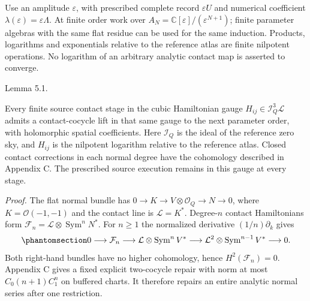 \documentclass[
  english,
  11pt,
  reqno]{amsart}
\makeatletter
\newcommand{\pandocstatementheading}[1]{%
  \par\addpenalty{\@beginparpenalty}%
  \addvspace{.5\baselineskip plus .2\baselineskip minus .2\baselineskip}%
  {\normalfont\bfseries #1\par}%
  \nobreak\@afterindenttrue\@afterheading
}
\makeatother
\begin{document}
Use an amplitude \(\varepsilon\), with prescribed complete record
\(\varepsilon U\) and numerical coefficient
\(\lambda(\varepsilon)=\varepsilon\Lambda\). At finite order work over
\(A_N=\mathbb C[\varepsilon]/(\varepsilon^{N+1})\); finite parameter
algebras with the same flat residue can be used for the same induction.
Products, logarithms and exponentials relative to the reference atlas
are finite nilpotent operations. No logarithm of an arbitrary analytic
contact map is asserted to converge.

\pandocstatementheading{\protect{}\label{lem:gg-contact-extension}

\protect\phantomsection\label{lem:gg-contact-extension-cubic}Lemma 5.1.}

Every finite source contact stage in the cubic Hamiltonian gauge
\(H_{ij}\in\mathcal I_Q^3\mathcal L\) admits a contact-cocycle lift in
that same gauge to the next parameter order, with holomorphic spatial
coefficients. Here \(\mathcal I_Q\) is the ideal of the reference zero
sky, and \(H_{ij}\) is the nilpotent logarithm relative to the reference
atlas. Closed contact corrections in each normal degree have the
cohomology described in Appendix C. The prescribed source execution
remains in this gauge at every stage.

\emph{Proof.} The flat normal bundle has
\(0\to K\to V\otimes\mathcal O_Q\to N\to0\), where
\(K=\mathcal O(-1,-1)\) and the contact line is \(\mathcal L=K^*\).
Degree-\(n\) contact Hamiltonians form
\(\mathcal F_n=\mathcal L\otimes\operatorname{Sym}^nN^*\). For \(n\ge1\)
the normalized derivative \((1/n)\partial_k\) gives
\begin{equation}\protect\phantomsection\label{eq:gg-contact-normal-sequence}{
 0\longrightarrow\mathcal F_n
 \longrightarrow\mathcal L\otimes\operatorname{Sym}^nV^*
 \longrightarrow\mathcal L^2\otimes\operatorname{Sym}^{n-1}V^*
 \longrightarrow0 .
}\end{equation} Both right-hand bundles have no higher cohomology, hence
\(H^2(\mathcal F_n)=0\). Appendix C gives a fixed explicit two-cocycle
repair with norm at most \(C_0(n+1)C_1^n\) on buffered charts. It
therefore repairs an entire analytic normal series after one
restriction.
\end{document}

